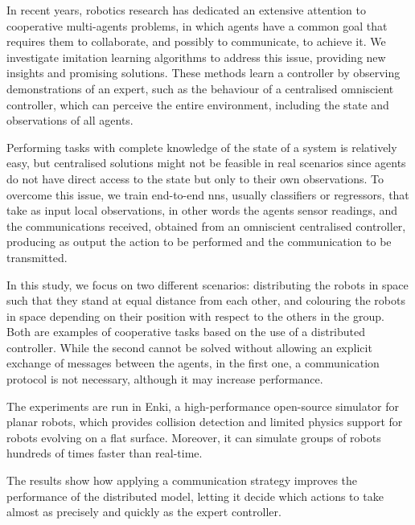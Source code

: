 In recent years, robotics research has dedicated an extensive attention to 
cooperative multi-agents problems, in which agents have a common goal that 
requires them to collaborate, and possibly to communicate, to achieve it.
We investigate imitation learning algorithms to address this issue, providing new 
insights and promising solutions. 
These methods learn a controller by observing demonstrations of an expert, such 
as the behaviour of a centralised omniscient controller, which can perceive the 
entire environment, including the state and observations of all agents. 

Performing tasks with complete knowledge of the state of a system is relatively 
easy, but centralised solutions might not be feasible in real scenarios since agents 
do not have direct access to the state but only to their own observations.
To overcome this issue, we train end-to-end \glspl{nn}, usually classifiers or 
regressors, that take as input local observations, in other words the agents sensor 
readings, and the communications received, obtained from an omniscient 
centralised controller, producing as output the action to be performed and the 
communication to be transmitted.

In this study, we focus on two different scenarios: distributing the robots in space 
such that they stand at equal distance from each other, and colouring the robots 
in space depending on their position with respect to the others in the group.
Both are examples of cooperative tasks based on the use of a distributed 
controller. While the second cannot be solved without allowing an explicit 
exchange of messages between the agents, in the first one, a communication 
protocol is not necessary, although it may increase performance.

The experiments are run in Enki, a high-performance open-source simulator for 
planar robots, which provides collision detection and limited physics support for 
robots evolving on a flat surface. Moreover, it can simulate groups of robots 
hundreds of times faster than real-time.


The results show how applying a communication strategy improves the 
performance of the distributed model, letting it decide which actions to take 
almost as precisely and quickly as the expert controller.